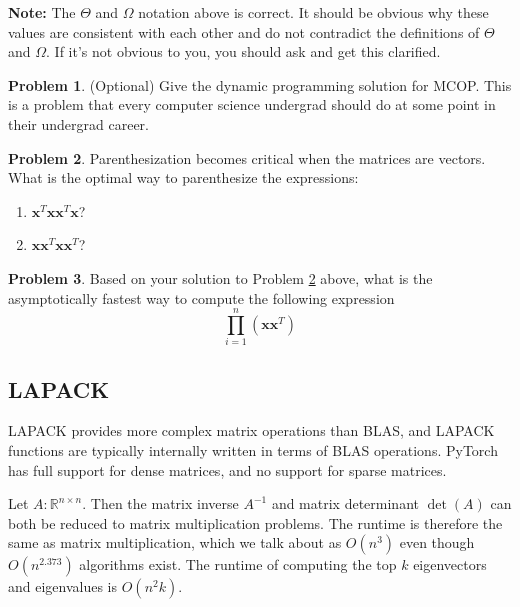 \documentclass[10pt]{article}
\theoremstyle{definition}
\newtheorem{problem}{Problem}
\newcommand{\R}{\mathbb R}
\DeclareMathOperator{\determinant}{det}
\newcommand{\trans}[1]{{#1}^{T}}
\newcommand{\x}{\mathbf x}
\begin{document}
\textbf{Note:}
The $\Theta$ and $\Omega$ notation above is correct.
It should be obvious why these values are consistent with each other and do not contradict the definitions of $\Theta$ and $\Omega$.
If it's not obvious to you, you should ask and get this clarified.

\begin{problem}
    (Optional)
    Give the dynamic programming solution for MCOP.
    This is a problem that every computer science undergrad should do at some point in their undergrad career.
    \vspace{4in}
\end{problem}

\newpage
\begin{problem}
    \label{prob:8}
    Parenthesization becomes critical when the matrices are vectors.
    What is the optimal way to parenthesize the expressions:
    \begin{enumerate}
        \item
            $\trans \x \x \trans \x \x$?
            \vspace{2in}
        \item
            $\x \trans \x \x \trans \x$?
            \vspace{2in}
    \end{enumerate}
\end{problem}

\begin{problem}
    Based on your solution to Problem \ref{prob:8} above,
    what is the asymptotically fastest way to compute the following expression
    \begin{equation}
        \prod_{i=1}^n (\x \trans \x)
    \end{equation}
    \vspace{2in}
\end{problem}


\newpage
\subsection{LAPACK}

LAPACK provides more complex matrix operations than BLAS,
and LAPACK functions are typically internally written in terms of BLAS operations.
PyTorch has full support for dense matrices,
and no support for sparse matrices.

Let $A : \R^{n \times n}$.
Then the matrix inverse $A^{-1}$ and matrix determinant $\determinant(A)$ can both be reduced to matrix multiplication problems.
The runtime is therefore the same as matrix multiplication, which we talk about as $O(n^3)$ even though $O(n^{2.373})$ algorithms exist.
The runtime of computing the top $k$ eigenvectors and eigenvalues is $O(n^2k)$.
\end{document}
